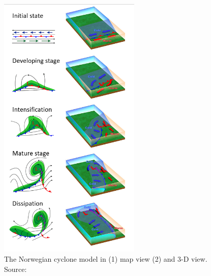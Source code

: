 \begin{figure}[h]
	\centering
	\noindent\includegraphics[width=16pc,angle=0]{cyclo_all.png}
	\caption{The Norwegian cyclone model in (1) map view (2) and 3-D view.  Source: \cite{norwegian}}\label{fig:norwegian_maps}
\end{figure}

%	

